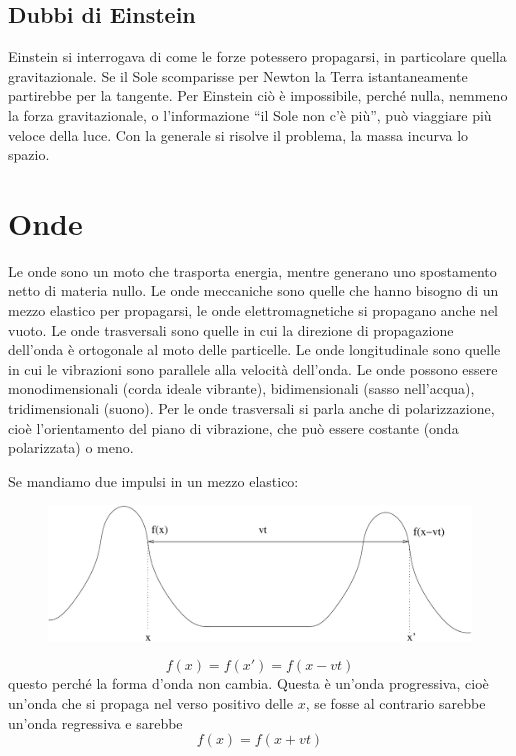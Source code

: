 \section{Dubbi di Einstein}
Einstein si interrogava di come le forze potessero propagarsi, in particolare quella gravitazionale. Se il Sole scomparisse per Newton la Terra istantaneamente partirebbe per la tangente. Per Einstein ciò è impossibile, perché nulla, nemmeno la forza gravitazionale, o l'informazione ``il Sole non c'è più'', può viaggiare più veloce della luce. Con la generale si risolve il problema, la massa incurva lo spazio.

\chapter{Onde}
\minitoc
Le onde sono un moto che trasporta energia, mentre generano uno spostamento netto di materia nullo. Le onde meccaniche sono quelle che hanno bisogno di un mezzo elastico per propagarsi, le onde elettromagnetiche si propagano anche nel vuoto. Le onde trasversali sono quelle in cui la direzione di propagazione dell'onda è ortogonale al moto delle particelle. Le onde longitudinale sono quelle in cui le vibrazioni sono parallele alla velocità dell'onda. Le onde possono essere monodimensionali (corda ideale vibrante), bidimensionali (sasso nell'acqua), tridimensionali (suono). Per le onde trasversali si parla anche di polarizzazione, cioè l'orientamento del piano di vibrazione, che può essere costante (onda polarizzata) o meno.

Se mandiamo due impulsi in un mezzo elastico:
\begin{figure}[htbp]
   \centering
   \includegraphics[scale=0.5]{immagini/fisica1/Onda1}
\end{figure}
\begin{equation}
   f(x)=f(x')=f(x-vt)
   \label{eq:onda_progressiva}
\end{equation}
questo perché la forma d'onda non cambia. Questa è un'onda progressiva, cioè un'onda che si propaga nel verso positivo delle $x$, se fosse al contrario sarebbe un'onda regressiva e sarebbe
\begin{equation}
   f(x)=f(x+vt)
   \label{eq:onda_regressiva}
\end{equation}

